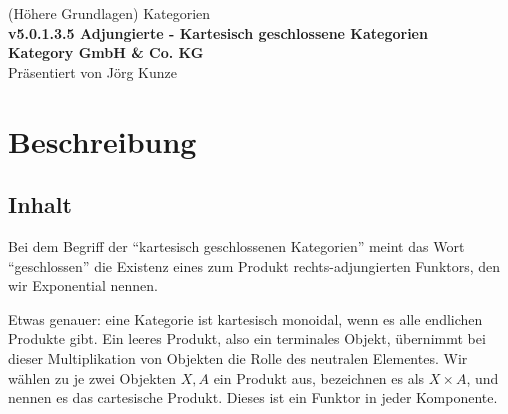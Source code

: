 \documentclass[a4paper]{amsart}
\theoremstyle{definition}
\begin{document}
\begin{titlepage}
\centering
{\huge
(Höhere Grundlagen) Kategorien\\[1cm]
\textbf{v5.0.1.3.5 Adjungierte - Kartesisch geschlossene Kategorien}
}\\[1cm]

\textbf{Kategory GmbH \& Co. KG}\\
Präsentiert von Jörg Kunze

\end{titlepage}

%

\newpage

\section*{Beschreibung}

\subsection*{Inhalt}
Bei dem Begriff der "`kartesisch geschlossenen Kategorien"' meint das Wort "`geschlossen"' die Existenz eines zum Produkt rechts-adjungierten Funktors, den wir Exponential nennen. 

Etwas genauer: eine Kategorie ist kartesisch monoidal, wenn es alle endlichen Produkte gibt. Ein leeres Produkt, also ein terminales Objekt, übernimmt bei dieser Multiplikation von Objekten die Rolle des neutralen Elementes. Wir wählen zu je zwei Objekten $X, A$ ein Produkt aus, bezeichnen es als $X \times A$, und nennen es das cartesische Produkt. Dieses ist ein Funktor in jeder Komponente.
\end{document}
